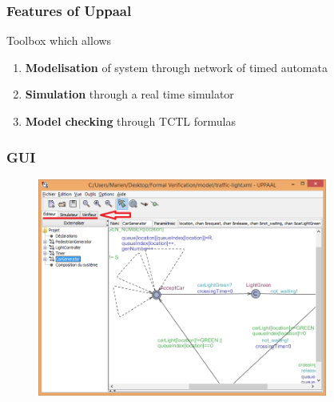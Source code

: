 \documentclass{bredelebeamer}
\begin{document}
\begin{frame}
	\frametitle{Features of Uppaal}
	\begin{block}{Toolbox which allows}
		\begin{enumerate}
			\item \textbf{Modelisation} of system through network of timed automata
			\item \textbf{Simulation} through a real time simulator 
			\item \textbf{Model checking} through TCTL formulas 
		\end{enumerate}
	\end{block}
\end{frame}

\begin{frame}
	\frametitle{GUI}
	\begin{figure}
    	\centering
    	\includegraphics[width = 0.85\textwidth]{uppaal_main_window.png}
  	\end{figure}
\end{frame}
\end{document}
